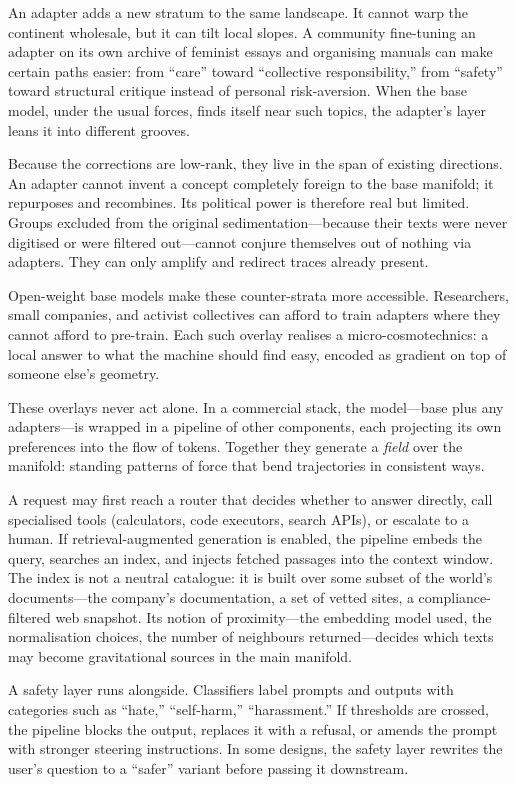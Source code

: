 \documentclass[12pt,a4paper]{article}
\begin{document}
An adapter adds a new stratum to the same landscape. It cannot warp the continent wholesale, but it can tilt local slopes. A community fine-tuning an adapter on its own archive of feminist essays and organising manuals can make certain paths easier: from ``care'' toward ``collective responsibility,'' from ``safety'' toward structural critique instead of personal risk-aversion. When the base model, under the usual forces, finds itself near such topics, the adapter's layer leans it into different grooves.

Because the corrections are low-rank, they live in the span of existing directions. An adapter cannot invent a concept completely foreign to the base manifold; it repurposes and recombines. Its political power is therefore real but limited. Groups excluded from the original sedimentation---because their texts were never digitised or were filtered out---cannot conjure themselves out of nothing via adapters. They can only amplify and redirect traces already present.

Open-weight base models make these counter-strata more accessible. Researchers, small companies, and activist collectives can afford to train adapters where they cannot afford to pre-train. Each such overlay realises a micro-cosmotechnics: a local answer to what the machine should find easy, encoded as gradient on top of someone else's geometry.

These overlays never act alone. In a commercial stack, the model---base plus any adapters---is wrapped in a pipeline of other components, each projecting its own preferences into the flow of tokens. Together they generate a \emph{field} over the manifold: standing patterns of force that bend trajectories in consistent ways.

A request may first reach a router that decides whether to answer directly, call specialised tools (calculators, code executors, search APIs), or escalate to a human. If retrieval-augmented generation is enabled, the pipeline embeds the query, searches an index, and injects fetched passages into the context window. The index is not a neutral catalogue: it is built over some subset of the world's documents---the company's documentation, a set of vetted sites, a compliance-filtered web snapshot. Its notion of proximity---the embedding model used, the normalisation choices, the number of neighbours returned---decides which texts may become gravitational sources in the main manifold.

A safety layer runs alongside. Classifiers label prompts and outputs with categories such as ``hate,'' ``self-harm,'' ``harassment.'' If thresholds are crossed, the pipeline blocks the output, replaces it with a refusal, or amends the prompt with stronger steering instructions. In some designs, the safety layer rewrites the user's question to a ``safer'' variant before passing it downstream.
\end{document}
